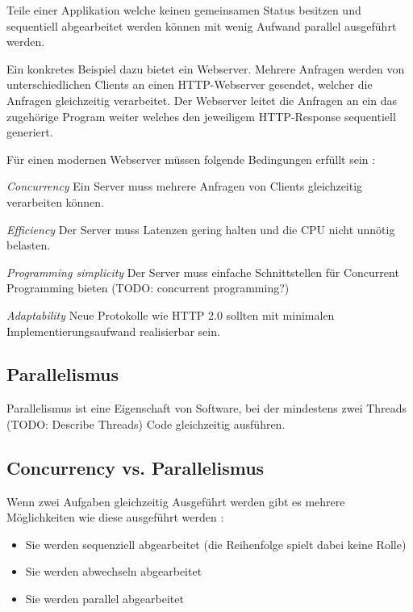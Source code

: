 Teile einer Applikation welche keinen gemeinsamen Status besitzen und sequentiell abgearbeitet werden können mit wenig Aufwand parallel ausgeführt werden. \cite[p. 18]{Can08}

Ein konkretes Beispiel dazu bietet ein Webserver. Mehrere Anfragen werden von unterschiedlichen Clients an einen HTTP-Webserver gesendet, welcher die Anfragen gleichzeitig verarbeitet. Der Webserver leitet die Anfragen an ein das zugehörige Program weiter welches den jeweiligem HTTP-Response sequentiell generiert. \cite[p. 18]{Can08}

Für einen modernen Webserver müssen folgende Bedingungen erfüllt sein \cite[p. 2]{Sch97}: 

\emph{Concurrency}
	Ein Server muss mehrere Anfragen von Clients gleichzeitig verarbeiten können. 

\emph{Efficiency}
	Der Server muss Latenzen gering halten und die CPU nicht unnötig belasten. 

\emph{Programming simplicity}
	Der Server muss einfache Schnittstellen für Concurrent Programming bieten (TODO: concurrent programming?)

\emph{Adaptability}
	Neue Protokolle wie HTTP 2.0 sollten mit minimalen Implementierungsaufwand realisierbar sein.



\subsection{Parallelismus}
\label{section:Parallelismus}

Parallelismus ist eine Eigenschaft von Software, bei der mindestens zwei Threads (TODO: Describe Threads) Code gleichzeitig ausführen. 


\subsection{Concurrency vs. Parallelismus}
\label{section:Parallelismus}

Wenn zwei Aufgaben gleichzeitig Ausgeführt werden gibt es mehrere Möglichkeiten wie diese ausgeführt werden \cite[p. 14]{Erb2012}:

\begin{itemize}
  \item Sie werden sequenziell abgearbeitet (die Reihenfolge spielt dabei keine Rolle)
  \item Sie werden abwechseln abgearbeitet
  \item Sie werden parallel abgearbeitet
\end{itemize}


